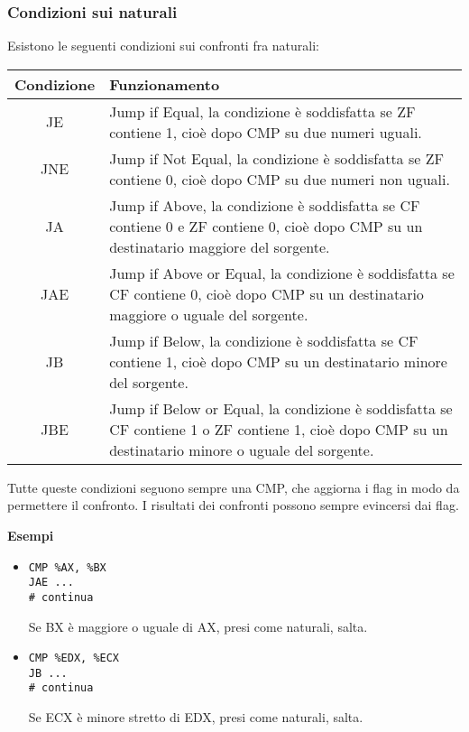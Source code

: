 \documentclass[a4paper,11pt]{article}
\begin{document}
\subsubsection{Condizioni sui naturali}
Esistono le seguenti condizioni sui confronti fra naturali:

\begin{table}[h!]
	\center {}
	\begin{tabular} { c  p{10cm} }
		\bfseries Condizione & \bfseries Funzionamento \\
		\hline 
		JE & Jump if Equal, la condizione è soddisfatta se ZF contiene 1, cioè dopo CMP su due numeri uguali. \\
		JNE & Jump if Not Equal, la condizione è soddisfatta se ZF contiene 0, cioè dopo CMP su due numeri non uguali. \\ 
		JA & Jump if Above, la condizione è soddisfatta se CF contiene 0 e ZF contiene 0, cioè dopo CMP su un destinatario maggiore del sorgente. \\
		JAE & Jump if Above or Equal, la condizione è soddisfatta se CF contiene 0, cioè dopo CMP su un destinatario maggiore o uguale del sorgente. \\ 
		JB & Jump if Below, la condizione è soddisfatta se CF contiene 1, cioè dopo CMP su un destinatario minore del sorgente. \\
		JBE & Jump if Below or Equal, la condizione è soddisfatta se CF contiene 1 o ZF contiene 1, cioè dopo CMP su un destinatario minore o uguale del sorgente. \\ 
	\end{tabular}
\end{table}

Tutte queste condizioni seguono sempre una CMP, che aggiorna i flag in modo da permettere il confronto.
I risultati dei confronti possono sempre evincersi dai flag.

\par\medskip
\noindent
\textbf{\textsf{Esempi}} \\
\begin{itemize}
	\item 
\begin{lstlisting}[language=assembler,style=codestyle]	
CMP %AX, %BX
JAE ...
# continua
\end{lstlisting}
Se BX è maggiore o uguale di AX, presi come naturali, salta.

	\item 
\begin{lstlisting}[language=assembler,style=codestyle]	
CMP %EDX, %ECX
JB ...
# continua
\end{lstlisting}
Se ECX è minore stretto di EDX, presi come naturali, salta.
\end{itemize}
\end{document}

